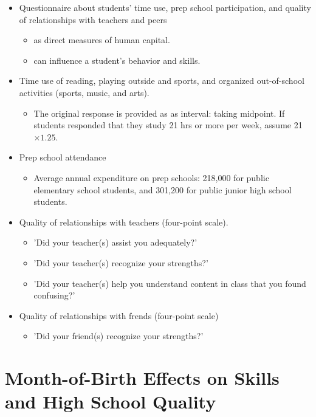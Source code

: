 \documentclass[../root]{subfiles}
\begin{document}
    \begin{itemize}
      \item Questionnaire about students' time use, prep school participation, and quality of relationships with teachers and peers
      \begin{itemize}
        \item as direct measures of human capital.
        \item can influence a student's behavior and skills.
      \end{itemize}
      \item Time use of reading, playing outside and sports, and organized out-of-school activities (sports, music, and arts).
      \begin{itemize}
        \item The original response is provided as as interval: taking midpoint. If students responded that they study 21 hrs or more per week, assume 21 $\times 1.25$.
      \end{itemize}
      \item Prep school attendance
      \begin{itemize}
        \item Average annual expenditure on prep schools: 218,000 for public elementary school students, and 301,200 for public junior high school students.
      \end{itemize}
      \item Quality of relationships with teachers (four-point scale).
      \begin{itemize}
        \item 'Did your teacher(s) assist you adequately?'
        \item 'Did your teacher(s) recognize your strengths?'
        \item 'Did your teacher(s) help you understand content in class that you found confusing?'
      \end{itemize}
      \item Quality of relationships with frends (four-point scale)
      \begin{itemize}
        \item 'Did your friend(s) recognize your strengths?'
      \end{itemize}
    \end{itemize}


    \section{Month-of-Birth Effects on Skills and High School Quality}
\end{document}
